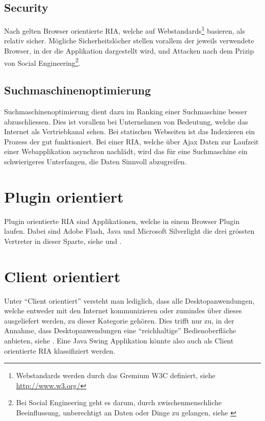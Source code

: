   \subsection{Security}
  
  Nach \cite{RichInternetApplication} gelten Browser orientierte \ac{RIA},
  welche auf Webstandards\footnote{Webstandards werden durch das Gremium W3C
  definiert, siehe \url{http://www.w3.org/}} basieren, als relativ sicher.
  Mögliche Sicherheitslöcher stellen vorallem der jeweils verwendete Browser,
  in der die Applikation dargestellt wird, und Attacken nach dem Prizip von
  Social Engineering\footnote{Bei Social Engineering geht es darum, durch
  zwischenmenschliche Beeinflussung, unberechtigt an Daten oder Dinge zu
  gelangen, siehe \cite{SocialEngineering}}.
  
  \subsection{Suchmaschinenoptimierung}
  
  Suchmaschinenoptimierung dient dazu im Ranking einer Suchmaschine besser
  abzuschliessen. Dies ist vorallem bei Unternehmen von Bedeutung, welche das
  Internet als Vertriebkanal sehen. Bei statischen Webseiten ist das Indexieren
  ein Prozess der gut funktioniert. Bei einer \ac{RIA}, welche über \ac{Ajax}
  Daten zur Laufzeit einer Webapplikation asynchron nachlädt, wird das für eine
  Suchmaschine ein schwierigeres Unterfangen, die Daten Sinnvoll abzugreifen.
  
  \section{Plugin orientiert}
  
  Plugin orientierte \ac{RIA} sind Applikationen, welche in einem Browser
  Plugin laufen. Dabei sind Adobe Flash, Java und Microsoft Silverlight die drei
  grössten Vertreter in dieser Sparte, siehe \cite{RichInternetApplications}
  und \cite{RichInternetApplicationMarketShare}.

  \section{Client orientiert}
  
  Unter ``Client orientiert'' versteht man lediglich, dass alle
  Desktopanwendungen, welche entweder mit den Internet kommunizieren oder
  zumindes über dieses ausgeliefert werden, zu dieser Kategorie gehören. Dies
  trifft nur zu, in der Annahme, dass Desktopanwendungen eine ``reichhaltige''
  Bedienoberfläche anbieten, siehe \cite{RichInternetApplication}. Eine Java
  Swing Applikation könnte also auch als Client orientierte \ac{RIA}
  klassifiziert werden.
